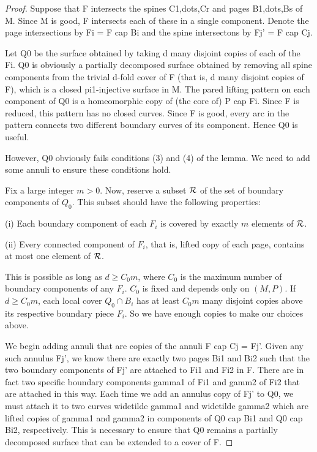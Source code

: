 \begin{proof}

Suppose that F intersects the spines C1,dots,Cr and pages B1,dots,Bs of M.
Since M is good, F intersects each of these in a single component. Denote the
page intersections by Fi = F cap Bi and the spine intersectons by Fj' = F cap
Cj.

Let Q0 be the surface obtained by taking d many disjoint copies of each of the
Fi. Q0 is obviously a partially decomposed surface obtained by removing all
spine components from the trivial d-fold cover of F (that is, d many disjoint
copies of F), which is a closed pi1-injective surface in M. The pared lifting
pattern on each component of Q0 is a homeomorphic copy of (the core of) P cap
Fi. Since F is reduced, this pattern has no closed curves. Since F is good,
every arc in the pattern connects two different boundary curves of its
component. Hence Q0 is useful.

However, Q0 obviously fails conditions (3) and (4) of the lemma. We need to add
some annuli to ensure these conditions hold.

Fix a large integer $m>0$. Now, reserve a subset $\mathcal{R}$ of the set of boundary
components of $Q_0$.  This subset should have the following properties:

(i) Each boundary component of each $F_i$ is covered by exactly $m$ elements of
$\mathcal{R}$.

(ii) Every connected component of $F_i$, that is, lifted copy of each page,
contains at most one element of $\mathcal{R}$.

This is possible as long as $d \geq C_0m$, where $C_0$ is the maximum number of
boundary components of any $F_i$. $C_0$ is fixed and depends only on $(M,P)$.
If $d\geq C_0m$,  each local cover $Q_0 \cap B_i$ has at least $C_0m$ many
disjoint copies above its respective boundary piece $F_i$.  So we have enough
copies to make our choices above.

We begin adding annuli that are copies of the annuli F cap Cj = Fj'. Given any
such annulus Fj', we know there are exactly two pages Bi1 and Bi2 such that the
two boundary components of Fj' are attached to Fi1 and Fi2 in F. There are in
fact two specific boundary components gamma1 of Fi1 and gamm2 of Fi2 that are
attached in this way. Each time we add an annulus copy of Fj' to Q0, we must
attach it to two curves widetilde gamma1 and widetilde gamma2 which are lifted
copies of gamma1 and gamma2 in components of Q0 cap Bi1 and Q0 cap Bi2,
respectively.  This is necessary to ensure that Q0 remains a partially
decomposed surface that can be extended to a cover of F.


\end{proof}
